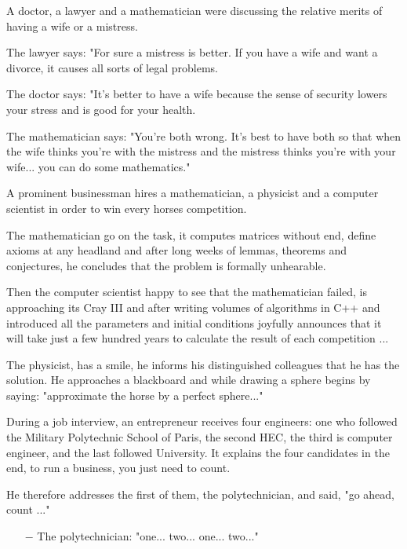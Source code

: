 A doctor, a lawyer and a mathematician were discussing the relative merits of having a wife or a mistress.

The lawyer says: "For sure a mistress is better. If you have a wife and want a divorce, it causes all sorts of legal problems.

The doctor says: "It's better to have a wife because the sense of security lowers your stress and is good for your health.

The mathematician says: "You're both wrong. It's best to have both so that when the wife thinks you're with the mistress and the mistress thinks you're with your wife... you can do some mathematics."
\begin{center}\underline{\hspace{5 cm}}\end{center}

A prominent businessman hires a mathematician, a physicist and a computer scientist in order to win every horses competition.

The mathematician go on the task, it computes matrices without end, define axioms at any headland and after long weeks of lemmas, theorems and conjectures, he concludes that the problem is formally unhearable.

Then the computer scientist happy to see that the mathematician failed, is approaching its Cray III and after writing volumes of algorithms in C++ and introduced all the parameters and initial conditions joyfully announces that it will take just a few hundred years to calculate the result of each competition ...

The physicist, has a smile, he informs his distinguished colleagues that he has the solution. He approaches a blackboard and while drawing a sphere begins by saying: "approximate the horse by a perfect sphere..."
\begin{center}\underline{\hspace{5 cm}}\end{center}

During a job interview, an entrepreneur receives four engineers: one who followed the Military Polytechnic School of Paris, the second HEC, the third is computer engineer, and the last followed University. It explains the four candidates in the end, to run a business, you just need to count.

He therefore addresses the first of them, the polytechnician, and said, "go ahead, count ..."

\begin{itemize}	 
	\item[$-$] The polytechnician: "one... two... one... two..."\end{itemize}


